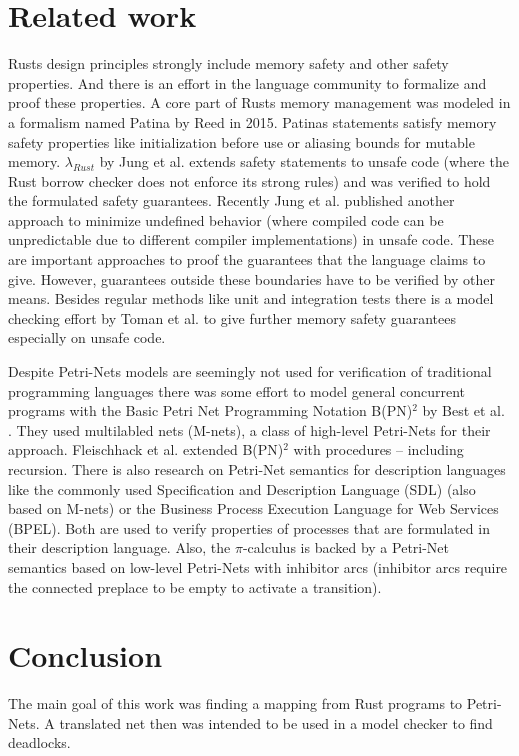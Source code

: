 \chapter{Related work}
Rusts design principles strongly include memory safety and other safety properties.
And there is an effort in the language community to formalize and proof these properties.
A core part of Rusts memory management was modeled in a formalism named Patina by Reed\cite{reed2015patina} in 2015.
Patinas statements satisfy memory safety properties like initialization before use or aliasing bounds for mutable memory.
$\lambda_{Rust}$ by Jung et al.\cite{Jung:2017:RSF:3177123.3158154} extends safety statements to unsafe code (where the Rust borrow checker does not enforce its strong rules) and was verified to hold the formulated safety guarantees.
Recently Jung et al. published another approach to minimize undefined behavior (where compiled code can be unpredictable due to different compiler implementations) in unsafe code.
These are important approaches to proof the guarantees that the language claims to give.
However, guarantees outside these boundaries have to be verified by other means.
Besides regular methods like unit and integration tests there is a model checking effort by Toman et al. \cite{toman2015crust} to give further memory safety guarantees especially on unsafe code.

Despite Petri-Nets models are seemingly not used for verification of traditional programming languages there was some effort to model general concurrent programs with the Basic Petri Net Programming Notation B(PN)$^2$ by Best et al. \cite{Best1993BPN2A}.
They used multilabled nets (M-nets)\cite{best1995class}, a class of high-level Petri-Nets for their approach.
Fleischhack et al. extended B(PN)$^2$ with procedures -- including recursion\cite{fleischhack1997petri}.
There is also research on Petri-Net semantics for description languages like the commonly used Specification and Description Language (SDL)\cite{fleischhack1998compositional} (also based on M-nets) or the Business Process Execution Language for Web Services (BPEL)\cite{stahl2005petri}\cite{lohmann2007feature}.
Both are used to verify properties of processes that are formulated in their description language.
Also, the $\pi$-calculus is backed by a Petri-Net semantics\cite{busi1995petri} based on low-level Petri-Nets with inhibitor arcs (inhibitor arcs require the connected preplace to be empty to activate a transition).

\chapter{Conclusion}
\label{conclusion}
The main goal of this work was finding a mapping from Rust programs to Petri-Nets.
A translated net then was intended to be used in a model checker to find deadlocks.

